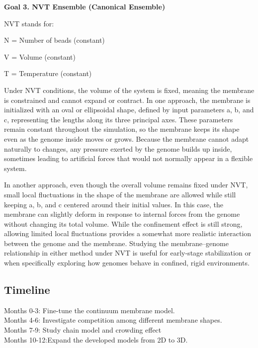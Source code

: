 \documentclass[12pt]{article}
\begin{document}
\begin{flushleft}
\noindent \textbf{Goal 3. NVT Ensemble (Canonical Ensemble)}

NVT stands for:

    N = Number of beads (constant)

    V = Volume (constant)

    T = Temperature (constant)

Under NVT conditions, the volume of the system is fixed, meaning the membrane is constrained and cannot expand or contract. In one approach, the membrane is initialized with an oval or ellipsoidal shape, defined by input parameters a, b, and c, representing the lengths along its three principal axes. These parameters remain constant throughout the simulation, so the membrane keeps its shape even as the genome inside moves or grows. Because the membrane cannot adapt naturally to changes, any pressure exerted by the genome builds up inside, sometimes leading to artificial forces that would not normally appear in a flexible system.

In another approach, even though the overall volume remains fixed under NVT, small local fluctuations in the shape of the membrane are allowed while still keeping a, b, and c centered around their initial values. In this case, the membrane can slightly deform in response to internal forces from the genome without changing its total volume. While the confinement effect is still strong, allowing limited local fluctuations provides a somewhat more realistic interaction between the genome and the membrane. Studying the membrane–genome relationship in either method under NVT is useful for early-stage stabilization or when specifically exploring how genomes behave in confined, rigid environments.

\subsection*{Timeline}
Months 0-3: Fine-tune the continuum membrane model.\\
Months 4-6: Investigate competition among different membrane shapes.\\
Months 7-9: Study chain model and crowding effect\\
Months 10-12:Expand the developed models from 2D to 3D.\\





\newpage

\end{flushleft}
\end{document}
